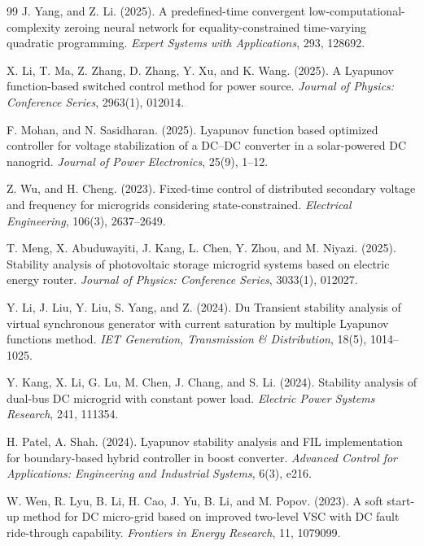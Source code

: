 \documentclass[]{interact}
\theoremstyle{plain}%
\theoremstyle{definition}
\theoremstyle{remark}
\begin{document}
\begin{thebibliography}{99}
J. Yang, and Z. Li. (2025). A predefined-time convergent low-computational-complexity zeroing neural network for equality-constrained time-varying quadratic programming. \emph{Expert Systems with Applications}, 293, 128692.

X. Li, T. Ma, Z. Zhang, D. Zhang, Y. Xu, and K. Wang. (2025). A Lyapunov function-based switched control method for power source. \emph{Journal of Physics: Conference Series}, 2963(1), 012014.

F. Mohan, and N. Sasidharan. (2025). Lyapunov function based optimized controller for voltage stabilization of a DC–DC converter in a solar-powered DC nanogrid. \emph{Journal of Power Electronics}, 25(9), 1–12.

Z. Wu, and H. Cheng. (2023). Fixed-time control of distributed secondary voltage and frequency for microgrids considering state-constrained. \emph{Electrical Engineering}, 106(3), 2637–2649.

T. Meng, X. Abuduwayiti, J. Kang, L. Chen, Y. Zhou, and M. Niyazi. (2025). Stability analysis of photovoltaic storage microgrid systems based on electric energy router. \emph{Journal of Physics: Conference Series}, 3033(1), 012027.

Y. Li, J. Liu, Y. Liu, S. Yang, and Z. (2024). Du Transient stability analysis of virtual synchronous generator with current saturation by multiple Lyapunov functions method. \emph{IET Generation, Transmission \& Distribution}, 18(5), 1014–1025.

Y. Kang, X. Li, G. Lu, M. Chen, J. Chang, and S. Li. (2024). Stability analysis of dual-bus DC microgrid with constant power load. \emph{Electric Power Systems Research}, 241, 111354.

H. Patel, A. Shah. (2024). Lyapunov stability analysis and FIL implementation for boundary-based hybrid controller in boost converter. \emph{Advanced Control for Applications: Engineering and Industrial Systems}, 6(3), e216.

W. Wen, R. Lyu, B. Li, H. Cao, J. Yu, B. Li, and M. Popov. (2023). A soft start-up method for DC micro-grid based on improved two-level VSC with DC fault ride-through capability. \emph{Frontiers in Energy Research}, 11, 1079099.


\end{thebibliography}
\end{document}

